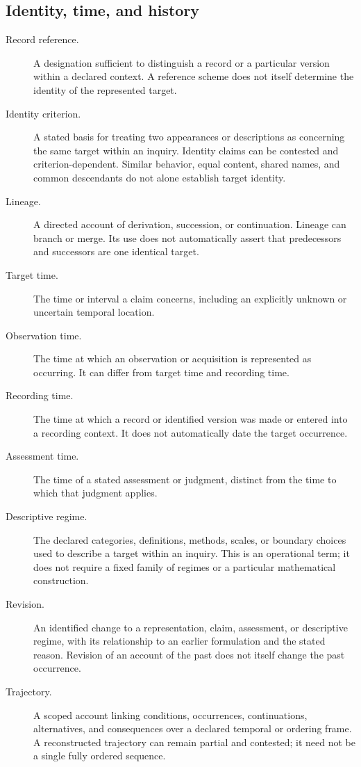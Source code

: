 \documentclass[11pt,a4paper]{article}
\begin{document}
\subsection{Identity, time, and history}
\begin{description}
\item[Record reference.] A designation sufficient to distinguish a record or a particular version within a declared context. A reference scheme does not itself determine the identity of the represented target.
\item[Identity criterion.] A stated basis for treating two appearances or descriptions as concerning the same target within an inquiry. Identity claims can be contested and criterion-dependent. Similar behavior, equal content, shared names, and common descendants do not alone establish target identity.
\item[Lineage.] A directed account of derivation, succession, or continuation. Lineage can branch or merge. Its use does not automatically assert that predecessors and successors are one identical target.
\item[Target time.] The time or interval a claim concerns, including an explicitly unknown or uncertain temporal location.
\item[Observation time.] The time at which an observation or acquisition is represented as occurring. It can differ from target time and recording time.
\item[Recording time.] The time at which a record or identified version was made or entered into a recording context. It does not automatically date the target occurrence.
\item[Assessment time.] The time of a stated assessment or judgment, distinct from the time to which that judgment applies.
\item[Descriptive regime.] The declared categories, definitions, methods, scales, or boundary choices used to describe a target within an inquiry. This is an operational term; it does not require a fixed family of regimes or a particular mathematical construction.
\item[Revision.] An identified change to a representation, claim, assessment, or descriptive regime, with its relationship to an earlier formulation and the stated reason. Revision of an account of the past does not itself change the past occurrence.
\item[Trajectory.] A scoped account linking conditions, occurrences, continuations, alternatives, and consequences over a declared temporal or ordering frame. A reconstructed trajectory can remain partial and contested; it need not be a single fully ordered sequence.
\end{description}
\end{document}
